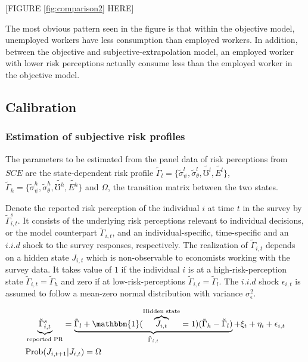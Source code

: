 \begin{center}
[FIGURE \ref{fig:comparison2} HERE]
\end{center}

The most obvious pattern seen in the figure is that within the objective model, unemployed workers have less consumption than employed workers. In addition, between the objective and subjective-extrapolation model, an employed worker with lower risk perceptions actually consume less than the employed worker in the objective model. 


\subsection{Calibration}


\subsubsection{Estimation of subjective risk profiles}

The parameters to be estimated from the panel data of risk perceptions from $SCE$ are the state-dependent risk profile $\tilde \Gamma_l=\{\tilde \sigma^l_\psi,\tilde \sigma^l_\theta, \tilde{\mho^l}, \tilde{E^l}\}$, $\tilde \Gamma_h =\{\tilde \sigma^h_\psi,\tilde \sigma^h_\theta, \tilde{\mho^h}, \tilde{E^h}\}$ and $\Omega$, the transition matrix between the two states.

Denote the reported risk perception of the individual $i$ at time $t$ in the survey by $\tilde \Gamma^s_{i,t}$. It consists of the underlying risk perceptions relevant to individual decisions, or the model counterpart $\tilde \Gamma_{i,t}$, and an individual-specific, time-specific and an $i.i.d$ shock to the survey responses, respectively. The realization of $\tilde \Gamma_{i,t}$ depends on a hidden state $J_{i,t}$ which is non-observable to economists working with the survey data. It takes value of $1$ if the individual $i$ is at a high-risk-perception state $\tilde \Gamma_{i,t}=\tilde \Gamma_h$ and zero if at low-risk-perceptions $\tilde \Gamma_{i,t} = \tilde \Gamma_l$. The $i.i.d$ shock $\epsilon_{i,t}$ is assumed to follow a mean-zero normal distribution with variance $\sigma^2_\epsilon$.  

\begin{equation*}
	\begin{split}
&	\underbrace{\tilde \Gamma^s_{i,t}}_{\text{reported PR}} = \underbrace{\tilde \Gamma_l + \mathbbm{1}(\overbrace{J_{i,t}}^{\text{Hidden state}}= 1)( \tilde \Gamma_h -\tilde \Gamma_l)}_{\tilde \Gamma_{i,t}} +\xi_{t}+\eta_{i}+ \epsilon_{i,t}\\
& \text{Prob}(J_{i,t+1}|J_{i,t}) = \Omega
\end{split}
\end{equation*}

